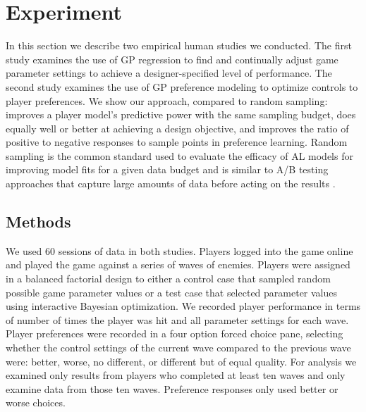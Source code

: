 \documentclass[letterpaper]{article}
\begin{document}
\section{Experiment}
In this section we describe two empirical human studies we conducted. The first study examines the use of GP regression to find and continually adjust game parameter settings to achieve a designer-specified level of performance. The second study examines the use of GP preference modeling to optimize controls to player preferences. We show our approach, compared to random sampling: improves a player model's predictive power with the same sampling budget, does equally well or better at achieving a design objective, and improves the ratio of positive to negative responses to sample points in preference learning. Random sampling is the common standard used to evaluate the efficacy of AL models for improving model fits for a given data budget and is similar to A/B testing approaches that capture large amounts of data before acting on the results \cite{settles2012:al-book}.


\subsection{Methods}
We used 60  sessions of data in both studies. Players logged into the game online and played the game against a series of waves of enemies. Players were assigned in a balanced factorial design to either a control case that sampled random possible game parameter values or a test case that selected parameter values using interactive Bayesian optimization.
We recorded player performance in terms of number of times the player was hit and all parameter settings for each wave. Player preferences were recorded in a four option forced choice pane, selecting whether the control settings of the current wave compared to the previous wave were: better, worse, no different, or different but of equal quality.
For analysis we examined only results from players who completed at least ten waves and only examine data from those ten waves. Preference responses only used better or worse choices.
\end{document}
